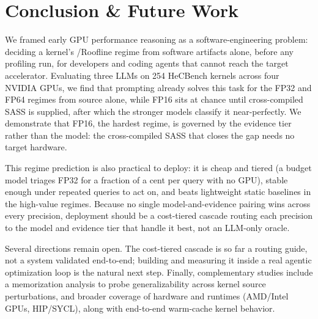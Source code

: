 \section{Conclusion \& Future Work}
\label{sec:conclusion}

We framed early GPU performance reasoning as a software-engineering problem: deciding a kernel's \bandwidthbound/\computebound Roofline regime from software artifacts alone, before any profiling run, for developers and coding agents that cannot reach the target accelerator.
Evaluating three LLMs on 254 HeCBench kernels across four NVIDIA GPUs, we find that prompting already solves this task for the FP32 and FP64 regimes from source alone, while FP16 sits at chance until cross-compiled SASS is supplied, after which the stronger models classify it near-perfectly.
We demonstrate that FP16, the hardest regime, is governed by the evidence tier rather than the model: the cross-compiled SASS that closes the gap needs no target hardware.

This regime prediction is also practical to deploy: it is cheap and tiered (a budget model triages FP32 for a fraction of a cent per query with no GPU), stable enough under repeated queries to act on, and beats lightweight static baselines in the high-value regimes.
Because no single model-and-evidence pairing wins across every precision, deployment should be a cost-tiered cascade routing each precision to the model and evidence tier that handle it best, not an LLM-only oracle.

Several directions remain open.
The cost-tiered cascade is so far a routing guide, not a system validated end-to-end; building and measuring it inside a real agentic optimization loop is the natural next step.
Finally, complementary studies include a memorization analysis to probe generalizability across kernel source perturbations, and broader coverage of hardware and runtimes (AMD/Intel GPUs, HIP/SYCL), along with end-to-end warm-cache kernel behavior.
